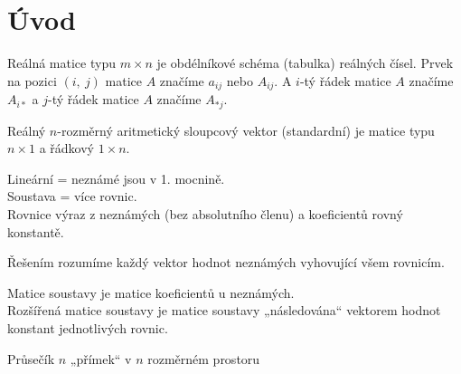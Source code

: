 \documentclass[12pt]{article}					%
\begin{document}
\section{Úvod}
    \begin{definice}[Matice]
            Reálná matice typu $ m \times n$ je obdélníkové schéma (tabulka) reálných čísel. Prvek na pozici $(i,\ j)$ matice $A$ značíme $a_{ij}$ nebo $A_{ij}$. A $i$-tý řádek matice $A$ značíme $A_{i*}$ a $j$-tý řádek matice $A$ značíme $A_{*j}$.
    \end{definice}

    \begin{definice}[Vektor]
        Reálný $n$-rozměrný aritmetický sloupcový vektor (standardní) je matice typu $n \times 1$ a řádkový $1 \times n$.
    \end{definice}

    \begin{definice}
        Lineární = neznámé jsou v 1. mocnině.\\
        Soustava = více rovnic.\\
        Rovnice výraz z neznámých (bez absolutního členu) a koeficientů rovný konstantě.
        \begin{definicein}[Řešení]
            Řešením rozumíme každý vektor hodnot neznámých vyhovující všem rovnicím.
        \end{definicein}

        \begin{definicein}
            Matice soustavy je matice koeficientů u neznámých.\\
            Rozšířená matice soustavy je matice soustavy „následována“ vektorem hodnot konstant jednotlivých rovnic.
        \end{definicein}

        \begin{poznamkain}
            Průsečík $n$ „přímek“ v $n$ rozměrném prostoru
        \end{poznamkain}
    \end{definice}
\end{document}

